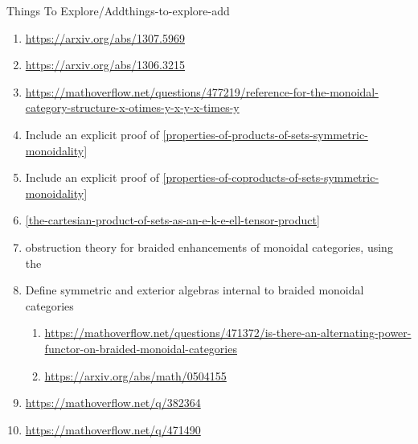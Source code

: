 \begin{remark}{Things To Explore/Add}{things-to-explore-add}
\begin{enumerate}
\begin{enumerate}
                \item A promonad is a monad in $\Prof$.
                \item There's a promonad $\mathfrak{p}$ in $\F$ defined by
                    \[
                        \mathfrak{p}(m,n)%
                        \defeq%
                        \{%
                            \text{surjections from $\{1,\ldots,m\}$ to $\{1,\ldots,n\}$}%
                        \}%
                    \]%
                    This promonad categorifies $\leq$ in that its values are the witnesses to the fact that $m$ is bigger than $n$ (i.e.\ surjections).
                \item Figure out whether this promonad extends to the 1-truncation of the sphere spectrum, and perhaps to other categorified analogues of monoids/groups/rings.
            \end{enumerate}
        \item \url{https://arxiv.org/abs/1307.5969}
        \item \url{https://arxiv.org/abs/1306.3215}
        \item \url{https://mathoverflow.net/questions/477219/reference-for-the-monoidal-category-structure-x-otimes-y-x-y-x-times-y}
        \item Include an explicit proof of \cref{properties-of-products-of-sets-symmetric-monoidality}
        \item Include an explicit proof of \cref{properties-of-coproducts-of-sets-symmetric-monoidality}
        \item \cref{the-cartesian-product-of-sets-as-an-e-k-e-ell-tensor-product}
        \item obstruction theory for braided enhancements of monoidal categories, using the 
        \item Define symmetric and exterior algebras internal to braided monoidal categories
            \begin{enumerate}
                \item \url{https://mathoverflow.net/questions/471372/is-there-an-alternating-power-functor-on-braided-monoidal-categories}
                \item \url{https://arxiv.org/abs/math/0504155}
            \end{enumerate}
        \item \url{https://mathoverflow.net/q/382364}
        \item \url{https://mathoverflow.net/q/471490}

\end{enumerate}
\end{remark}
